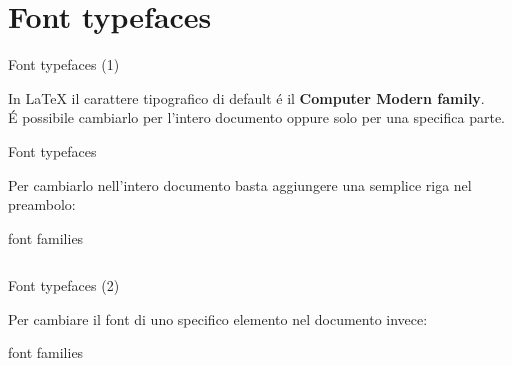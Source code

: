 \section{Font typefaces}

\begin{frame}{Font typefaces (1)}

    In \LaTeX{} il carattere tipografico di default é il \textbf{Computer Modern family}.
    \\ É possibile cambiarlo per l'intero documento oppure solo per una specifica parte.
\end{frame}   

\begin{frame}{Font typefaces}

    Per cambiarlo nell'intero documento basta aggiungere una semplice riga nel preambolo:
    \begin{esempio}{font families}
           \inputminted[linenos,fontsize=\small]{latex}{res/examples/typeface_doc.tex}
    \end{esempio}


\end{frame}

\begin{frame}{Font typefaces (2)}

    Per cambiare il font di uno specifico elemento nel documento invece:
     \begin{esempio}{font families}
               \inputminted[linenos,fontsize=\small]{latex}{res/examples/typeface_element.tex}
    \end{esempio}



    
\end{frame}